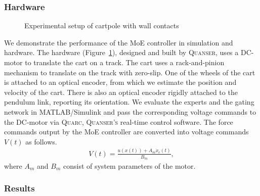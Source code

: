 \subsubsection{Hardware}

\begin{figure}[tb]
    \centering
    \caption{Experimental setup of cartpole with wall contacts}
    \label{fig:cartpole_hardware}
\end{figure}
%
We demonstrate the performance of the MoE controller in simulation and hardware. 
%
The hardware (Figure~\ref{fig:cartpole_hardware}), designed and built by
\textsc{Quanser}\cite{Quanser_2021}, uses a DC-motor to translate the cart on a
track.
% 
The cart uses a rack-and-pinion mechanism to translate on the track with
zero-slip.
%
One of the wheels of the cart is attached to an optical encoder, from which we
estimate the position and velocity of the cart.
%
There is also an optical encoder rigidly attached to the pendulum link,
reporting its orientation. 
%
%
We evaluate the experts and the gating network in MATLAB/Simulink and pass the
corresponding voltage commands to the DC-motor via \textsc{Quarc},
\textsc{Quanser's} real-time control software.
%
The force commands output by the MoE controller are converted into voltage
commands $V(t)$ as follows.
\begin{align*}
    V(t) = \frac{u(x(t)) + A_m \dot{x}_c(t)}{B_m},
\end{align*} 
\noindent where $A_m$ and $B_m$ consist of system parameters of the motor.


\subsubsection{Results}

